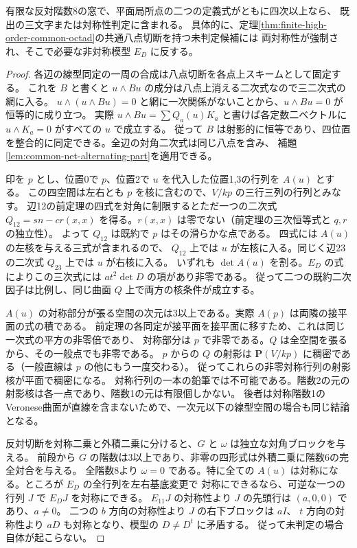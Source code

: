 \begin{theorem}\label{thm:high-order-octad-bisymmetry}
有限な反対階数8の窓で、平面局所点の二つの定義式がともに四次以上なら、
既出の三文字または対称性判定に含まれる。
具体的に、定理\ref{thm:finite-high-order-common-octad}の共通八点切断を持つ未判定候補には
両対称性が強制され、そこで必要な非対称模型 $E_D$ に反する。
\end{theorem}
\begin{proof}
各辺の線型同定の一周の合成は八点切断を各点上スキームとして固定する。
これを $B$ と書くと $u\wedge Bu$ の成分は八点上消える二次式なので三二次式の網に入る。
$u\wedge(u\wedge Bu)=0$ と網に一次関係がないことから、$u\wedge Bu=0$ が恒等的に成り立つ。
実際 $u\wedge Bu=\sum Q_a(u)K_a$ と書けば各定数二ベクトルに $u\wedge K_a=0$ がすべての $u$ で成立する。
従って $B$ は射影的に恒等であり、四位置を整合的に同定できる。全辺の対角二次式は同じ八点を含み、
補題\ref{lem:common-net-alternating-part}を適用できる。

印を $p$ とし、位置0で $p$、位置2で $u$ を代入した位置1,3の行列を $A(u)$ とする。
この四空間は左右とも $p$ を核に含むので、$V/kp$ の三行三列の行列とみなす。
辺12の前定理の四式を対角に制限するとただ一つの二次式
$Q_{12}=sn-c r(x,x)$ を得る。$r(x,x)$ は零でない（前定理の三次恒等式と $q,r$ の独立性）。
よって $Q_{12}$ は既約で $p$ はその滑らかな点である。
四式には $A(u)$ の左核を与える三式が含まれるので、
$Q_{12}$ 上では $u$ が左核に入る。同じく辺23の二次式 $Q_{23}$ 上では $u$ が右核に入る。
いずれも $\det A(u)$ を割る。$E_D$ の式によりこの三次式には $at^2\det D$ の項があり非零である。
従って二つの既約二次因子は比例し、同じ曲面 $Q$ 上で両方の核条件が成立する。

$A(u)$ の対称部分が張る空間の次元は3以上である。実際 $A(p)$ は両隣の接平面の式の積である。
前定理の各同定が接平面を接平面に移すため、これは同じ一次式の平方の非零倍であり、
対称部分は $p$ で非零である。$Q$ は全空間を張るから、その一般点でも非零である。
$p$ からの $Q$ の射影は $\mathbf P(V/kp)$ に稠密である（一般直線は $p$ の他にもう一度交わる）。
従ってこれらの非零対称行列の射影核が平面で稠密になる。
対称行列の一本の鉛筆では不可能である。階数2の元の射影核は各一点であり、階数1の元は有限個しかない。
後者は対称階数1のVeronese曲面が直線を含まないためで、一次元以下の線型空間の場合も同じ結論となる。

反対切断を対称二乗と外積二乗に分けると、$G$ と $\omega$ は独立な対角ブロックを与える。
前段から $G$ の階数は3以上であり、非零の四形式は外積二乗に階数6の完全対合を与える。
全階数8より $\omega=0$ である。特に全ての $A(u)$ は対称になる。ところが $E_D$ の全行列を左右基底変更で
対称にできるなら、可逆な一つの行列 $J$ で $E_D J$ を対称にできる。
$E_{11}J$ の対称性より $J$ の先頭行は $(a,0,0)$ であり、$a\ne0$。
二つの $b$ 方向の対称性より $J$ の右下ブロックは $aI$、
$t$ 方向の対称性より $aD$ も対称となり、模型の $D\ne D^t$ に矛盾する。
従って未判定の場合自体が起こらない。
\end{proof}
